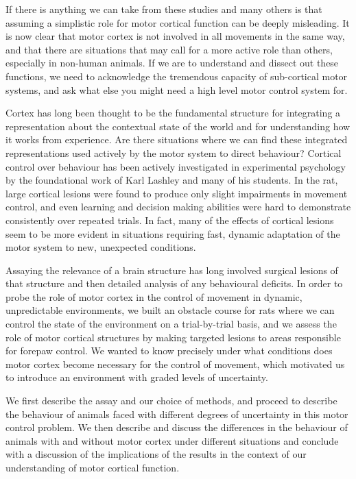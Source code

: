 If there is anything we can take from these studies and many others is that assuming a simplistic role for motor cortical function can be deeply misleading. It is now clear that motor cortex is not involved in all movements in the same way, and that there are situations that may call for a more active role than others, especially in non-human animals. If we are to understand and dissect out these functions, we need to acknowledge the tremendous capacity of sub-cortical motor systems, and ask what else you might need a high level motor control system for.

Cortex has long been thought to be the fundamental structure for integrating a representation about the contextual state of the world and for understanding how it works from experience. Are there situations where we can find these integrated representations used actively by the motor system to direct behaviour? Cortical control over behaviour has been actively investigated in experimental psychology by the foundational work of Karl Lashley and many of his students. In the rat, large cortical lesions were found to produce only slight impairments in movement control, and even learning and decision making abilities were hard to demonstrate consistently over repeated trials. In fact, many of the effects of cortical lesions seem to be more evident in situations requiring fast, dynamic adaptation of the motor system to new, unexpected conditions.

Assaying the relevance of a brain structure has long involved surgical lesions of that structure and then detailed analysis of any behavioural deficits. In order to probe the role of motor cortex in the control of movement in dynamic, unpredictable environments, we built an obstacle course for rats where we can control the state of the environment on a trial-by-trial basis, and we assess the role of motor cortical structures by making targeted lesions to areas responsible for forepaw control. We wanted to know precisely under what conditions does motor cortex become necessary for the control of movement, which motivated us to introduce an environment with graded levels of uncertainty.

We first describe the assay and our choice of methods, and proceed to describe the behaviour of animals faced with different degrees of uncertainty in this motor control problem. We then describe and discuss the differences in the behaviour of animals with and without motor cortex under different situations and conclude with a discussion of the implications of the results in the context of our understanding of motor cortical function.
